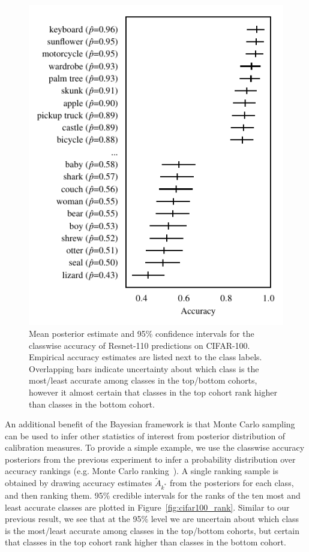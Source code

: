 \documentclass{article}
\begin{document}
\begin{figure}[t]
    \centering
    \includegraphics{figures/cifar100_accuracy.pdf}
    \caption{
        Mean posterior estimate and 95\% confidence intervals for the classwise accuracy of Resnet-110 predictions on CIFAR-100.
        Empirical accuracy estimates are listed next to the class labels.
        Overlapping bars indicate uncertainty about which class is the most/least accurate among classes in the top/bottom cohorts, however it almost certain that classes in the top cohort rank higher than classes in the bottom cohort.
    }
    \label{fig:cifar100_acc}
\end{figure}

An additional benefit of the Bayesian framework is that Monte Carlo sampling can be used to infer other statistics of interest from posterior distribution of calibration measures.
To provide a simple example, we use the classwise accuracy posteriors from the previous experiment to infer a probability distribution over accuracy rankings (e.g. Monte Carlo ranking~\cite{marshall1998league}).
A single ranking sample is obtained by drawing accuracy estimates $\tilde{A}_{k^*}$ from the posteriors for each class, and then ranking them.
95\% credible intervals for the ranks of the ten most and least accurate classes are plotted in Figure~\ref{fig:cifar100_rank}.
Similar to our previous result, we see that at the 95\% level we are uncertain about which class is the most/least accurate among classes in the top/bottom cohorts, but certain that classes in the top cohort rank higher than classes in the bottom cohort.
\end{document}
